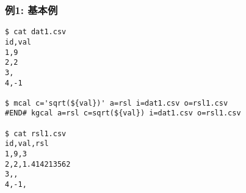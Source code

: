 
\subsubsection*{例1: 基本例}


\begin{Verbatim}[baselinestretch=0.7,frame=single]
$ cat dat1.csv
id,val
1,9
2,2
3,
4,-1

$ mcal c='sqrt(${val})' a=rsl i=dat1.csv o=rsl1.csv
#END# kgcal a=rsl c=sqrt(${val}) i=dat1.csv o=rsl1.csv

$ cat rsl1.csv
id,val,rsl
1,9,3
2,2,1.414213562
3,,
4,-1,
\end{Verbatim}
